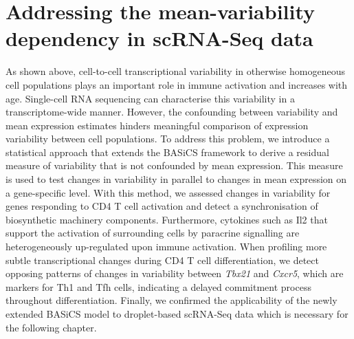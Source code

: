 
\chapter{Addressing the mean-variability dependency in scRNA-Seq data}  

\graphicspath{{"../../Dropbox (Cambridge  University)/Figures_for_thesis/Chapter2/"}}

\vfill

\begin{Abstract}
As shown above, cell-to-cell transcriptional variability in otherwise homogeneous cell populations plays an important role in immune activation and increases with age. Single-cell RNA sequencing can characterise this variability in a transcriptome-wide manner. However, the confounding between variability and mean expression estimates hinders meaningful comparison of expression variability between cell populations. To address this problem, we introduce a statistical approach that extends the BASiCS framework to derive a residual measure of variability that is not confounded by mean expression. This measure is used to test changes in variability in parallel to changes in mean expression on a gene-specific level. With this method, we assessed changes in variability for genes responding to CD4\plus{} T cell activation and detect a synchronisation of biosynthetic machinery components. Furthermore, cytokines such as Il2 that support the activation of surrounding cells by paracrine signalling are heterogeneously up-regulated upon immune activation. When profiling more subtle transcriptional changes during CD4\plus{} T cell differentiation, we detect opposing patterns of changes in variability between \textit{Tbx21} and \textit{Cxcr5}, which are markers for Th1 and Tfh cells, indicating a delayed commitment process throughout differentiation. Finally, we confirmed the applicability of the newly extended BASiCS model to droplet-based scRNA-Seq data which is necessary for the following chapter.
\end{Abstract}

\vfill

\newpage

